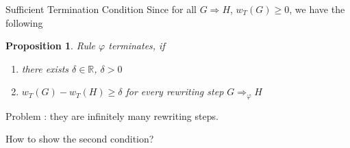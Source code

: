 \documentclass{beamer}
\newtheorem{proposition}{Proposition}
\begin{document}

\begin{frame}{Sufficient Termination Condition}
  Since for all $G \Rightarrow H$, $w_T(G) \geq 0$, we have the following

  \begin{proposition}
  Rule $\varphi$ terminates, if 

   \begin{enumerate}
      \item there exists $\delta \in \mathbb{R}$, $\delta > 0$
      \item $w_T(G) - w_T(H) \geq \delta$ for every rewriting step $G \Rightarrow_\varphi H$
   \end{enumerate} 
  \end{proposition}


   Problem : they are infinitely many rewriting steps.

   How to show the second condition?

\end{frame}
\end{document}
